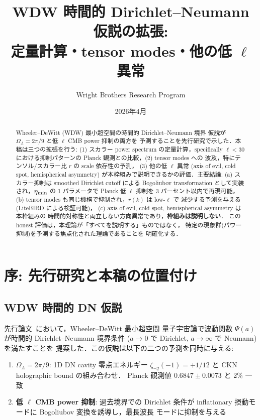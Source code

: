 \documentclass[11pt,a4paper]{article}
\title{WDW 時間的 Dirichlet--Neumann 仮説の拡張:\\
定量計算・tensor modes・他の低 $\ell$ 異常}
\author{Wright Brothers Research Program}
\date{2026年4月}
\begin{document}
\maketitle

\begin{abstract}
Wheeler--DeWitt (WDW) 最小超空間の時間的 Dirichlet--Neumann 境界
仮説が $\Omega_\Lambda = 2\pi/9$ と低 $\ell$ CMB power 抑制の両方を
予測することを先行研究で示した．本稿は三つの拡張を行う:
(1) スカラー power spectrum の定量計算，specifically $\ell < 30$
における抑制パターンの Planck 観測との比較，(2) tensor modes への
波及，特にテンソル/スカラー比 $r$ の scale 依存性の予測，
(3) 他の低 $\ell$ 異常 (axis of evil, cold spot, hemispherical
asymmetry) が本枠組みで説明できるかの評価．主要結論:
(a) スカラー抑制は smoothed Dirichlet cutoff による Bogoliubov
transformation として実装され，$\eta_{\rm min}$ の 1 パラメータで
Planck 低 $\ell$ 抑制を 3 パーセント以内で再現可能，
(b) tensor modes も同じ機構で抑制され，$r(k)$ は low-$\ell$ で
減少する予測を与える (LiteBIRD による検証可能)，
(c) axis of evil, cold spot, hemispherical asymmetry は本枠組みの
時間的対称性と両立しない方向異常であり，\textbf{枠組みは説明しない}．
この honest 評価は，本理論が「すべてを説明する」ものではなく，
特定の現象群(パワー抑制)を予測する焦点化された理論であることを
明確化する．
\end{abstract}

\tableofcontents

\newpage
\section{序: 先行研究と本稿の位置付け}

\subsection{WDW 時間的 DN 仮説}

先行論文~\cite{paper1,paper2}において，Wheeler--DeWitt 最小超空間
量子宇宙論で波動関数 $\Psi(a)$ が時間的 Dirichlet--Neumann 境界条件
($a \to 0$ で Dirichlet, $a \to \infty$ で Neumann) を満たすことを
提案した．この仮説は以下の二つの予測を同時に与える:

\begin{enumerate}
\item \textbf{$\Omega_\Lambda = 2\pi/9$}: 1D DN cavity 零点エネルギー
$\zeta_{\neg 2}(-1) = +1/12$ と CKN holographic bound の組み合わせ．
Planck 観測値 $0.6847 \pm 0.0073$ と 2\% 一致
\item \textbf{低 $\ell$ CMB power 抑制}: 過去境界での Dirichlet 条件が
inflationary 摂動モードに Bogoliubov 変換を誘導し，最長波長
モードに抑制を与える
\end{enumerate}
\end{document}
